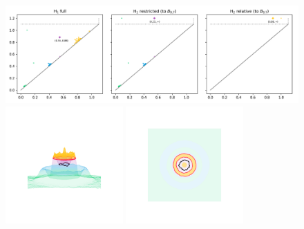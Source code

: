 \begin{figure}[htbp]
  \centering
  \includegraphics[width=\textwidth]{scripts/figures/relative/dgm-2_0.png}
  \includegraphics[trim=500 800 500 800, clip, width=0.4\textwidth]{scripts/figures/relative/surf_side-2_0.png}
  \includegraphics[trim=500 500 500 500, clip, width=0.4\textwidth]{scripts/figures/relative/surf_top-2_0.png}
\end{figure}

